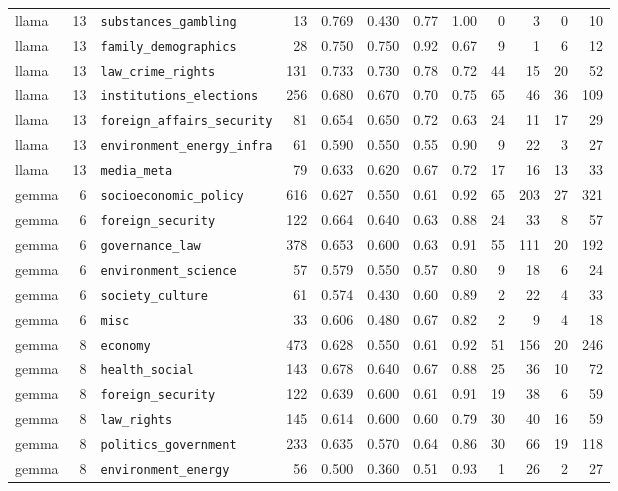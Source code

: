 \begin{landscape}
\begin{longtable}{@{}l r l r r r r r r r r r@{}}
llama & 13 & \texttt{substances\_gambling} & 13 & 0.769 & 0.430 & 0.77 & 1.00 & 0 & 3 & 0 & 10\\
llama & 13 & \texttt{family\_demographics} & 28 & 0.750 & 0.750 & 0.92 & 0.67 & 9 & 1 & 6 & 12\\
llama & 13 & \texttt{law\_crime\_rights} & 131 & 0.733 & 0.730 & 0.78 & 0.72 & 44 & 15 & 20 & 52\\
llama & 13 & \texttt{institutions\_elections} & 256 & 0.680 & 0.670 & 0.70 & 0.75 & 65 & 46 & 36 & 109\\
llama & 13 & \texttt{foreign\_affairs\_security} & 81 & 0.654 & 0.650 & 0.72 & 0.63 & 24 & 11 & 17 & 29\\
llama & 13 & \texttt{environment\_energy\_infra} & 61 & 0.590 & 0.550 & 0.55 & 0.90 & 9 & 22 & 3 & 27\\
llama & 13 & \texttt{media\_meta} & 79 & 0.633 & 0.620 & 0.67 & 0.72 & 17 & 16 & 13 & 33\\
\midrule
gemma & 6 & \texttt{socioeconomic\_policy} & 616 & 0.627 & 0.550 & 0.61 & 0.92 & 65 & 203 & 27 & 321\\
gemma & 6 & \texttt{foreign\_security} & 122 & 0.664 & 0.640 & 0.63 & 0.88 & 24 & 33 & 8 & 57\\
gemma & 6 & \texttt{governance\_law} & 378 & 0.653 & 0.600 & 0.63 & 0.91 & 55 & 111 & 20 & 192\\
gemma & 6 & \texttt{environment\_science} & 57 & 0.579 & 0.550 & 0.57 & 0.80 & 9 & 18 & 6 & 24\\
gemma & 6 & \texttt{society\_culture} & 61 & 0.574 & 0.430 & 0.60 & 0.89 & 2 & 22 & 4 & 33\\
gemma & 6 & \texttt{misc} & 33 & 0.606 & 0.480 & 0.67 & 0.82 & 2 & 9 & 4 & 18\\
\midrule
gemma & 8 & \texttt{economy} & 473 & 0.628 & 0.550 & 0.61 & 0.92 & 51 & 156 & 20 & 246\\
gemma & 8 & \texttt{health\_social} & 143 & 0.678 & 0.640 & 0.67 & 0.88 & 25 & 36 & 10 & 72\\
gemma & 8 & \texttt{foreign\_security} & 122 & 0.639 & 0.600 & 0.61 & 0.91 & 19 & 38 & 6 & 59\\
gemma & 8 & \texttt{law\_rights} & 145 & 0.614 & 0.600 & 0.60 & 0.79 & 30 & 40 & 16 & 59\\
gemma & 8 & \texttt{politics\_government} & 233 & 0.635 & 0.570 & 0.64 & 0.86 & 30 & 66 & 19 & 118\\
gemma & 8 & \texttt{environment\_energy} & 56 & 0.500 & 0.360 & 0.51 & 0.93 & 1 & 26 & 2 & 27\\

\end{longtable}
\end{landscape}
